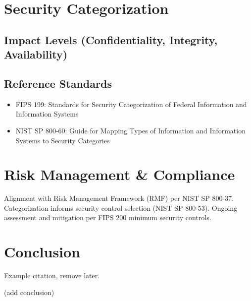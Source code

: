 \documentclass{article}
\begin{document}
\section{Security Categorization}



\subsection{Impact Levels (Confidentiality, Integrity, Availability)}




\newpage

\subsection{Reference Standards}
\begin{itemize}
    \item FIPS 199: Standards for Security Categorization of Federal Information and Information Systems
    \item NIST SP 800-60: Guide for Mapping Types of Information and Information Systems to Security Categories
\end{itemize}


\section{Risk Management \& Compliance}
\par Alignment with Risk Management Framework (RMF) per NIST SP 800-37. 
Categorization informs security control selection (NIST SP 800-53). 
Ongoing assessment and mitigation per FIPS 200 minimum security controls.

\section{Conclusion}
\par Example citation, remove later. \cite{fips199}
\par (add conclusion)



{}
\end{document}
